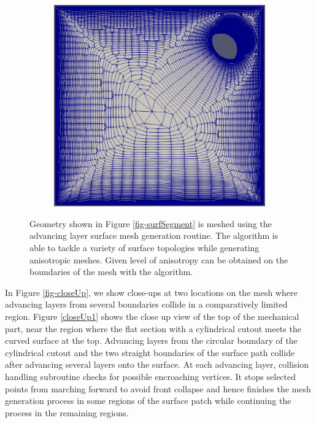 \begin{figure}[hbt!]
\begin{subfigure}{0.33\textwidth}
		\includegraphics[width=0.9\linewidth]{img/r/joint-x0.004-g1.04-a5/bottom.eps}
		\caption{}
		\label{fig-joint-bottom}
	\end{subfigure}
	\caption{Geometry shown in Figure \ref{fig-surfSegment} is meshed using the advancing layer surface mesh generation routine. The algorithm is able to tackle a variety of surface topologies while generating anisotropic meshes. Given level of anisotropy can be obtained on the boundaries of the mesh with the algorithm.}
	\label{fig-joint}
\end{figure}

In Figure \ref{fig-closeUp}, we show close-ups at two locations on the mesh where advancing layers from several boundaries collide in a comparatively limited region. Figure \ref{closeUp1} shows the close up view of the top of the mechanical part, near the region where the flat section with a cylindrical cutout meets the curved surface at the top. Advancing layers from the circular boundary of the cylindrical cutout and the two straight boundaries of the surface path collide after advancing several layers onto the surface. At each advancing layer, collision handling subroutine checks for possible encroaching vertices. It stops selected points from marching forward to avoid front collapse and hence finishes the mesh generation process in some regions of the surface patch while continuing the process in the remaining regions.

